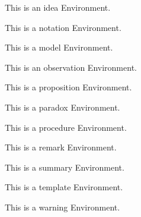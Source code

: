 \documentclass{ximera}
\begin{document}
\begin{idea}
    This is an idea Environment.
\end{idea}%
\begin{notation}
    This is a notation Environment.
\end{notation}%
\begin{model}
    This is a model Environment.
\end{model}%
\begin{observation}
    This is an observation Environment.
\end{observation}%
\begin{proposition}
    This is a proposition Environment.
\end{proposition}%
\begin{paradox}
    This is a paradox Environment.
\end{paradox}%
\begin{procedure}
    This is a procedure Environment.
\end{procedure}%
\begin{remark}
    This is a remark Environment.
\end{remark}%
\begin{summary}
    This is a summary Environment.
\end{summary}%
\begin{template}
    This is a template Environment.
\end{template}%
\begin{warning}
    This is a warning Environment.
\end{warning}%


\hrulefill
\end{document}
